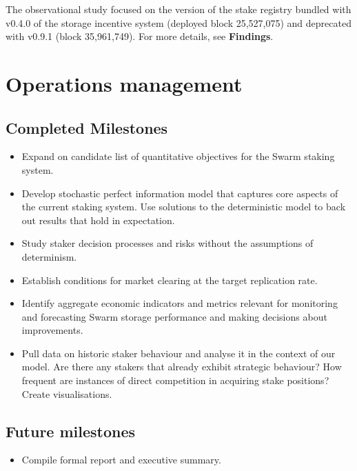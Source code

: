 The observational study focused on the version of the stake registry bundled with v0.4.0 of the storage incentive system (deployed block 25,527,075) and deprecated with v0.9.1 (block 35,961,749).
%
For more details, see \textbf{Findings}.

\section*{Operations management}

\subsection*{Completed Milestones}

\begin{itemize}
  \item 
    Expand on candidate list of quantitative objectives for the Swarm staking system.
  \item 
    Develop stochastic perfect information model that captures core aspects of the current staking system. 
    Use solutions to the deterministic model to back out results that hold in expectation.

  \item Study staker decision processes and risks without the assumptions of determinism.
  
  \item Establish conditions for market clearing at the target replication rate.
  
  \item Identify aggregate economic indicators and metrics relevant for monitoring and forecasting Swarm storage performance and making decisions about improvements.

  
  \item Pull data on historic staker behaviour and analyse it in the context of our model. Are there any stakers that already exhibit strategic behaviour? How frequent are instances of direct competition in acquiring stake positions? Create visualisations.
\end{itemize}

\subsection*{Future milestones}

\begin{itemize}
  \item Compile formal report and executive summary.
\end{itemize}

